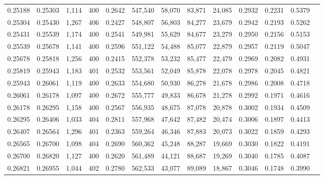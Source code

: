 \begin{tabular}{rrrrrrrrrrrrr}
0.25188 & 0.25303 &  1,114 & 400 &                                     0.2642 & 547,540 &  58,070 &  83,871 &  24,085 & 0.2932 & 0.2231 & 0.5379 \\
0.25304 & 0.25430 &  1,267 & 406 &                                     0.2427 & 548,807 &  56,803 &  84,277 &  23,679 & 0.2942 & 0.2193 & 0.5262 \\
0.25431 & 0.25539 &  1,174 & 400 &                                     0.2541 & 549,981 &  55,629 &  84,677 &  23,279 & 0.2950 & 0.2156 & 0.5153 \\
0.25539 & 0.25678 &  1,141 & 400 &                                     0.2596 & 551,122 &  54,488 &  85,077 &  22,879 & 0.2957 & 0.2119 & 0.5047 \\
0.25678 & 0.25818 &  1,256 & 400 &                                     0.2415 & 552,378 &  53,232 &  85,477 &  22,479 & 0.2969 & 0.2082 & 0.4931 \\
0.25819 & 0.25943 &  1,183 & 401 &                                     0.2532 & 553,561 &  52,049 &  85,878 &  22,078 & 0.2978 & 0.2045 & 0.4821 \\
0.25943 & 0.26061 &  1,119 & 400 &                                     0.2633 & 554,680 &  50,930 &  86,278 &  21,678 & 0.2986 & 0.2008 & 0.4718 \\
0.26061 & 0.26178 &  1,097 & 400 &                                     0.2672 & 555,777 &  49,833 &  86,678 &  21,278 & 0.2992 & 0.1971 & 0.4616 \\
0.26178 & 0.26295 &  1,158 & 400 &                                     0.2567 & 556,935 &  48,675 &  87,078 &  20,878 & 0.3002 & 0.1934 & 0.4509 \\
0.26295 & 0.26406 &  1,033 & 404 &                                     0.2811 & 557,968 &  47,642 &  87,482 &  20,474 & 0.3006 & 0.1897 & 0.4413 \\
0.26407 & 0.26564 &  1,296 & 401 &                                     0.2363 & 559,264 &  46,346 &  87,883 &  20,073 & 0.3022 & 0.1859 & 0.4293 \\
0.26565 & 0.26700 &  1,098 & 404 &                                     0.2690 & 560,362 &  45,248 &  88,287 &  19,669 & 0.3030 & 0.1822 & 0.4191 \\
0.26700 & 0.26820 &  1,127 & 400 &                                     0.2620 & 561,489 &  44,121 &  88,687 &  19,269 & 0.3040 & 0.1785 & 0.4087 \\
0.26821 & 0.26955 &  1,044 & 402 &                                     0.2780 & 562,533 &  43,077 &  89,089 &  18,867 & 0.3046 & 0.1748 & 0.3990 \\

\end{tabular}
